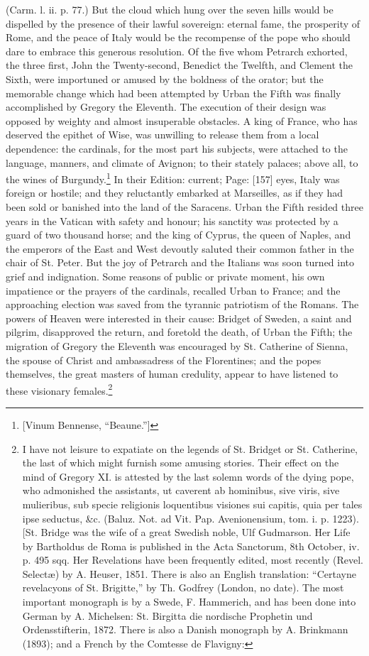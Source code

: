 {(Carm. l. ii. p. 77.)} But the cloud which hung over the seven hills would be dispelled by the presence of their lawful sovereign: eternal fame, the prosperity of Rome, and the peace of Italy would be the recompense of the pope who should dare to embrace this generous resolution. Of the five whom Petrarch exhorted, the three first, John the Twenty-second, Benedict the Twelfth, and Clement the Sixth, were importuned or amused by the boldness of the orator; but the memorable change which had been attempted by Urban the Fifth was finally accomplished by Gregory the Eleventh. The execution of their design was opposed by weighty and almost insuperable obstacles. A king of France, who has deserved the epithet of Wise, was unwilling to release them from a local dependence: the cardinals, for the most part his subjects, were attached to the language, manners, and climate of Avignon; to their stately palaces; above all, to the wines of Burgundy.\footnote{[Vinum Bennense, \texthebrew{“}Beaune.\texthebrew{}”]} In their Edition: current; Page: [157] eyes, Italy was foreign or hostile; and they reluctantly embarked at Marseilles, as if they had been sold or banished into the land of the Saracens. Urban the Fifth resided three years in the Vatican with safety and honour; his sanctity was protected by a guard of two thousand horse; and the king of Cyprus, the queen of Naples, and the emperors of the East and West devoutly saluted their common father in the chair of St. Peter. But the joy of Petrarch and the Italians was soon turned into grief and indignation. Some reasons of public or private moment, his own impatience or the prayers of the cardinals, recalled Urban to France; and the approaching election was saved from the tyrannic patriotism of the Romans. The powers of Heaven were interested in their cause: Bridget of Sweden, a saint and pilgrim, disapproved the return, and foretold the death, of Urban the Fifth; the migration of Gregory the Eleventh was encouraged by St. Catherine of Sienna, the spouse of Christ and ambassadress of the Florentines; and the popes themselves, the great masters of human credulity, appear to have listened to these visionary females.\footnote{I have not leisure to expatiate on the legends of St. Bridget or St. Catherine, the last of which might furnish some amusing stories. Their effect on the mind of Gregory XI. is attested by the last solemn words of the dying pope, who admonished the assistants, ut caverent ab hominibus, sive viris, sive mulieribus, sub specie religionis loquentibus visiones sui capitis, quia per tales ipse seductus, \&c. (Baluz. Not. ad Vit. Pap. Avenionensium, tom. i. p. 1223). [St. Bridge was the wife of a great Swedish noble, Ulf Gudmarson. Her Life by Bartholdus de Roma is published in the Acta Sanctorum, 8th October, iv. p. 495 sqq. Her Revelations have been frequently edited, most recently (Revel. Selectæ) by A. Heuser, 1851. There is also an English translation: \texthebrew{“}Certayne revelacyons of St. Brigitte,\texthebrew{}” by Th. Godfrey (London, no date). The most important monograph is by a Swede, F. Hammerich, and has been done into German by A. Michelsen: St. Birgitta die nordische Prophetin und Ordensstifterin, 1872. There is also a Danish monograph by A. Brinkmann (1893); and a French by the Comtesse de Flavigny: }
